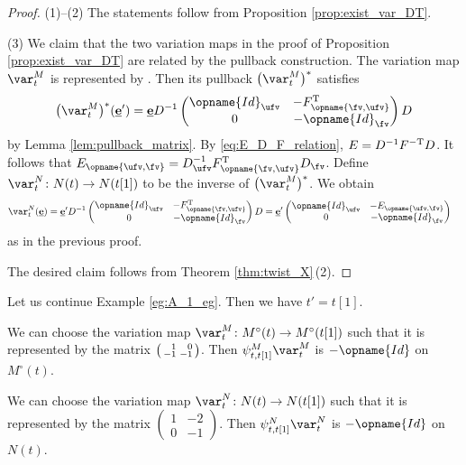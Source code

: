 \documentclass[pdftex]{sigma}
\newcommand{\Mc}{M^\circ}
\newcommand{\Id}{{\opname{Id}}}
\newcommand{\ee}{\mathbf{e}}
\newcommand{\uee}{\underline{\ee}}
\newcommand{\high}{\opname{\ufv,\fv}}
\newcommand{\low}{\opname{\fv,\ufv}}
\numberwithin{equation}{section}
\begin{document}
\begin{proof}
(1)--(2) The statements follow from Proposition \ref{prop:exist_var_DT}.

(3) We claim that the two variation maps in the proof of Proposition
\ref{prop:exist_var_DT} are related by the pullback construction.
The variation map $\var_{t}^{M}$ is represented by \smash{$\left(\begin{smallmatrix}
\Id_{\ufv} & 0\\
-F_{\low} & -\Id_{\fv}
\end{smallmatrix}\right)$}. Then its pullback $\bigl(\var_{t}^{M}\bigr)^{*}$ satisfies \[\bigl(\var_{t}^{M}\bigr)^{*}(\uee')=\uee D^{-1}\begin{pmatrix}
\Id_{\ufv} & -F_{\low}^{\rm T}\\
0 & -\Id_{\fv}
\end{pmatrix}D\] by Lemma \ref{lem:pullback_matrix}. By \eqref{eq:E_D_F_relation},
$E=D^{-1}F^{\rm -T}D$. It follows that $E_{\high}=D_{\ufv}^{-1}F_{\low}^{\rm T}D_{\fv}$.
Define $\var_{t}^{N}\colon N(t)\rightarrow N(t[1])$ to be the inverse of
$\bigl(\var_{t}^{M}\bigr)^{*}$. We obtain
\begin{align*}
\var_{t}^{N}(\uee) & =\uee'D^{-1}\begin{pmatrix}
\Id_{\ufv} & -F_{\low}^{\rm T}\\
0 & -\Id_{\fv}
\end{pmatrix}D =\uee'\begin{pmatrix}
\Id_{\ufv} & -E_{\high}\\
0 & -\Id_{\fv}
\end{pmatrix}
\end{align*}
as in the previous proof.

The desired claim follows from Theorem \ref{thm:twist_X}\,(2).
\end{proof}

\begin{Example}\label{eg:A_1_variation_map}
Let us continue Example \ref{eg:A_1_eg}. Then we have $t'=t[1]$.

We can choose the variation map $\var_{t}^{M}\colon\Mc(t)\rightarrow\Mc(t[1])$
such that it is represented by the matrix $\left(\begin{smallmatrix}
\hphantom{-}1 & \hphantom{-}0\\
-1 & -1
\end{smallmatrix}\right)$. Then $\psi_{t,t[1]}^{M}\var_{t}^{M}$ is $-\Id$ on $\Mc(t)$.

We can choose the variation map $\var_{t}^{N}\colon N(t)\rightarrow N(t[1])$
such that it is represented by the matrix $\left(\begin{smallmatrix}
1 & -2\\
0 & -1
\end{smallmatrix}\right)$. Then $\psi_{t,t[1]}^{N}\var_{t}^{N}$ is $-\Id$ on $N(t)$.

\end{Example}
\end{document}
